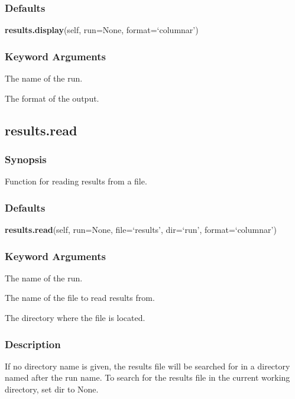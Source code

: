 \subsubsection{Defaults}

\textsf{\textbf{results.display}(self, run=None, format=`columnar')}


\subsubsection{Keyword Arguments}


  The name of the run.

  The format of the output.


\newpage

\subsection{results.read}


\subsubsection{Synopsis}

Function for reading results from a file.

\subsubsection{Defaults}

\textsf{\textbf{results.read}(self, run=None, file=`results', dir=`run', format=`columnar')}


\subsubsection{Keyword Arguments}


  The name of the run.

  The name of the file to read results from.

  The directory where the file is located.

\subsubsection{Description}

If no directory name is given, the results file will be searched for in a directory named
after the run name.  To search for the results file in the current working directory, set
dir to None.


